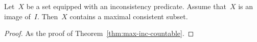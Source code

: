 \documentclass[envcountsect,envcountsame,runningheads]{llncs}
\renewcommand{\_}{\mathpunct{.}\,}
\begin{document}
\begin{theorem}\label{thm:max-inc-wf}Let~$X$ be a set equipped
with an inconsistency predicate. Assume that~$X$ is an image of~$I$.
Then~$X$ contains a maximal consistent subset.\end{theorem}

\begin{proof}As the proof of Theorem~\ref{thm:max-inc-countable}.\end{proof}



\end{document}
